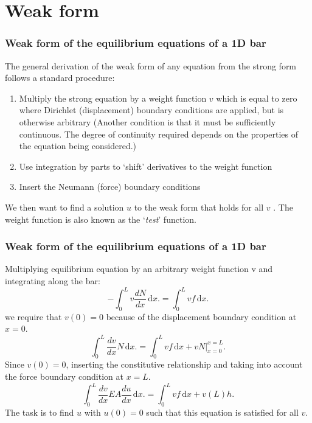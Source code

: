\documentclass[handout]{beamer}
\begin{document}
\section{Weak form}
\begin{frame}
\frametitle{Weak form of the equilibrium equations of a 1D bar}
The general derivation of the weak form of any equation from the strong form
follows a standard procedure:

\begin{enumerate}
	\item Multiply the strong equation by a weight function $v$ which is equal to zero where
	Dirichlet (displacement) boundary conditions are applied, but is otherwise arbitrary 
	(Another condition is that it must be sufficiently continuous. The degree of continuity 
	required depends on the properties of the equation being considered.)
	\item Use integration by parts to `shift' derivatives to the weight function
	\item Insert the Neumann (force) boundary conditions
\end{enumerate}

We then want to find a solution $u$ to the weak form that holds for all $v$ . The weight
function is also known as the `\textit{test}' function.
\end{frame}

\begin{frame}
\frametitle{Weak form of the equilibrium equations of a 1D bar}
Multiplying equilibrium equation by an arbitrary weight function v and
integrating along the bar:
\begin{equation*}
-\int_0^L v \frac{dN}{dx}\, \mathrm{d}x. = \int_0^L v f\, \mathrm{d}x.
\end{equation*}
we require that $v(0) = 0$ because of the displacement boundary condition at $x = 0$.
\begin{equation*}
\int_0^L \frac{dv}{dx} N\, \mathrm{d}x. = \int_0^L v f\, \mathrm{d}x + v N |_{x=0}^{x=L}.
\end{equation*}
Since $v(0) = 0$, inserting the constitutive relationship and taking into account the force
boundary condition at $x = L$.
\begin{equation*}
\int_0^L \frac{dv}{dx} EA \frac{du}{dx}\, \mathrm{d}x. = \int_0^L v f\, \mathrm{d}x + v(L)h.
\end{equation*}
The task is to find $u$ with $u(0) = 0$ such that this equation is satisfied for all $v$.
\end{frame}
\end{document}
